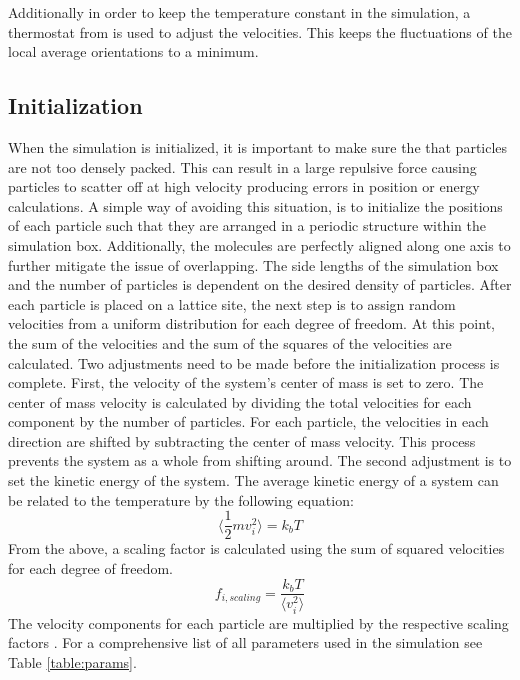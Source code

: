 \documentclass[preprint, aps]{revtex4-1}
\begin{document}
Additionally in order to keep the temperature constant in the simulation, a
thermostat from \cite{ilnytskyi02} is used to adjust the velocities. This keeps 
the fluctuations of the local average orientations to a minimum.

\subsection*{Initialization}
When the simulation is initialized, it is important to make sure the that 
particles are not too densely packed. This can result in a large repulsive force
causing particles to scatter off at high velocity producing errors in position 
or energy calculations. A simple way of avoiding this situation, is to 
initialize the positions of each particle such that they are arranged in a 
periodic structure within the simulation box. Additionally, the molecules are
perfectly aligned along one axis to further mitigate the issue of overlapping. 
The side lengths of the simulation box and the number of particles is dependent
on the desired density of particles. After each particle is placed on a lattice
site, the next step is to assign random velocities from a uniform distribution
for each degree of freedom. At this point, the sum of the velocities and the sum
of the squares of the velocities are calculated. Two adjustments need to be made
before the initialization process is complete. First, the velocity of the
system's center of mass is set to zero. The center of mass velocity is
calculated by dividing the total velocities for each component by the number of
particles. For each particle, the velocities in each direction are shifted by
subtracting the center of mass velocity. This process prevents the system as a
whole from shifting around. The second adjustment is to set the kinetic energy
of the system. The average kinetic energy of a system can be related to the
temperature by the following equation:
	\begin{equation}
		\langle \frac{1}{2}mv_i^2 \rangle=k_bT
	\end{equation}
From the above, a scaling factor is calculated using the sum of squared 
velocities for each degree of freedom.
	\begin{equation}
		f_{i,scaling}=\frac{k_bT}{\langle v_i^2 \rangle}
	\end{equation}
The velocity components for each particle are multiplied by the respective 
scaling factors \cite{frenkel01}. For a comprehensive list of all parameters
used in the simulation see Table \ref{table:params}.
\end{document}
